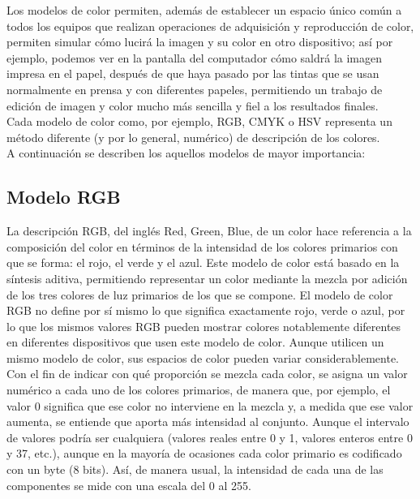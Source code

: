 Los modelos de color permiten, además de establecer un espacio único común a todos los equipos que realizan operaciones de adquisición y reproducción de color, permiten simular cómo lucirá la imagen y su color en otro dispositivo; así por ejemplo, podemos ver en la pantalla del computador cómo saldrá la imagen impresa en el papel, después de que haya pasado por las tintas que se usan normalmente en prensa y con diferentes papeles, permitiendo un trabajo de edición de imagen y color mucho más sencilla y fiel a los resultados finales.\\

Cada modelo de color como, por ejemplo, RGB, CMYK o HSV representa un método diferente (y por lo general, numérico) de descripción de los colores.\\

A continuación se describen los aquellos modelos de mayor importancia:

\subsection{Modelo RGB}

La descripción RGB, del inglés Red, Green, Blue, de un color hace referencia a la composición del color en términos de la intensidad de los colores primarios con que se forma: el rojo, el verde y el azul. Este modelo de color está basado en la síntesis aditiva, permitiendo representar un color mediante la mezcla por adición de los tres colores de luz primarios de los que se compone. El modelo de color RGB no define por sí mismo lo que significa exactamente rojo, verde o azul, por lo que los mismos valores RGB pueden mostrar colores notablemente diferentes en diferentes dispositivos que usen este modelo de color. Aunque utilicen un mismo modelo de color, sus espacios de color pueden variar considerablemente.
Con el fin de indicar con qué proporción se mezcla cada color, se asigna un valor numérico a cada uno de los colores primarios, de manera que, por ejemplo, el valor 0 significa que ese color no interviene en la mezcla y, a medida que ese valor aumenta, se entiende que aporta más intensidad al conjunto. Aunque el intervalo de valores podría ser cualquiera (valores reales entre 0 y 1, valores enteros entre 0 y 37, etc.), aunque en la mayoría de ocasiones cada color primario es codificado con un byte (8 bits). Así, de manera usual, la intensidad de cada una de las componentes se mide con una escala del 0 al 255.\\

